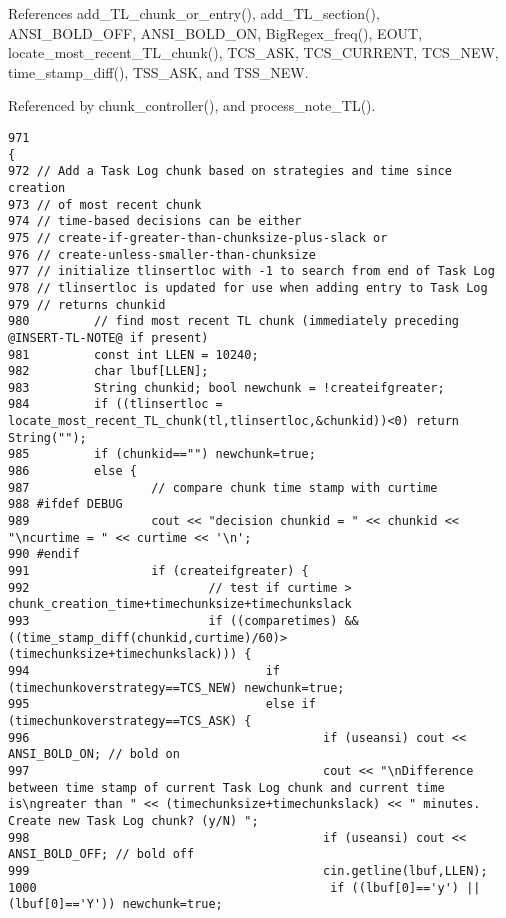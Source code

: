 References add\_\-TL\_\-chunk\_\-or\_\-entry(), add\_\-TL\_\-section(), ANSI\_\-BOLD\_\-OFF, ANSI\_\-BOLD\_\-ON, Big\-Regex\_\-freq(), EOUT, locate\_\-most\_\-recent\_\-TL\_\-chunk(), TCS\_\-ASK, TCS\_\-CURRENT, TCS\_\-NEW, time\_\-stamp\_\-diff(), TSS\_\-ASK, and TSS\_\-NEW.

Referenced by chunk\_\-controller(), and process\_\-note\_\-TL().



\footnotesize\begin{verbatim}971                                                                                                            {
972 // Add a Task Log chunk based on strategies and time since creation
973 // of most recent chunk
974 // time-based decisions can be either
975 // create-if-greater-than-chunksize-plus-slack or
976 // create-unless-smaller-than-chunksize
977 // initialize tlinsertloc with -1 to search from end of Task Log
978 // tlinsertloc is updated for use when adding entry to Task Log
979 // returns chunkid
980         // find most recent TL chunk (immediately preceding @INSERT-TL-NOTE@ if present)
981         const int LLEN = 10240;
982         char lbuf[LLEN];
983         String chunkid; bool newchunk = !createifgreater;
984         if ((tlinsertloc = locate_most_recent_TL_chunk(tl,tlinsertloc,&chunkid))<0) return String("");
985         if (chunkid=="") newchunk=true;
986         else {
987                 // compare chunk time stamp with curtime
988 #ifdef DEBUG
989                 cout << "decision chunkid = " << chunkid << "\ncurtime = " << curtime << '\n';
990 #endif
991                 if (createifgreater) {
992                         // test if curtime > chunk_creation_time+timechunksize+timechunkslack
993                         if ((comparetimes) && ((time_stamp_diff(chunkid,curtime)/60)>(timechunksize+timechunkslack))) {
994                                 if (timechunkoverstrategy==TCS_NEW) newchunk=true;
995                                 else if (timechunkoverstrategy==TCS_ASK) {
996                                         if (useansi) cout << ANSI_BOLD_ON; // bold on
997                                         cout << "\nDifference between time stamp of current Task Log chunk and current time is\ngreater than " << (timechunksize+timechunkslack) << " minutes. Create new Task Log chunk? (y/N) ";
998                                         if (useansi) cout << ANSI_BOLD_OFF; // bold off
999                                         cin.getline(lbuf,LLEN);
1000                                         if ((lbuf[0]=='y') || (lbuf[0]=='Y')) newchunk=true;

\end{verbatim}
